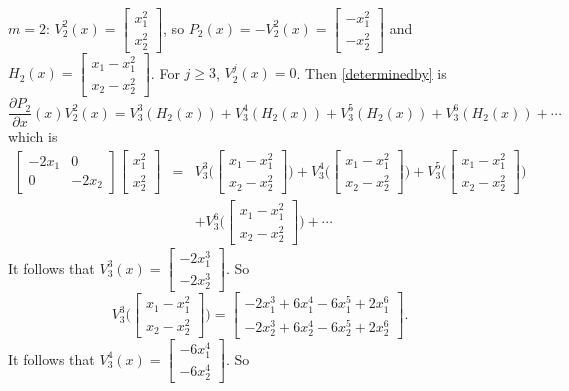 \documentclass{article}
\begin{document}
$m=2$:
$V_2^2(x)=\begin{bmatrix}x_1^2\\x_2^2\end{bmatrix}$, so $P_2(x)=-V_2^2(x)=\begin{bmatrix}
-x_1^2\\-x_2^2\end{bmatrix}$ and $H_2(x)=\begin{bmatrix}x_1-x_1^2\\x_2-x_2^2\end{bmatrix}$.
For $j \geq 3$, $V_2^j(x)=0$. Then \eqref{determinedby} is
\[
\frac{\partial P_2}{\partial x}(x)V_2^2(x)=V_3^3(H_2(x))+V_3^4(H_2(x))+V_3^5(H_2(x))+
V_3^6(H_2(x))+\cdots
\]
which is
\begin{eqnarray*}
\begin{bmatrix}-2x_1&0\\0&-2x_2\end{bmatrix}\begin{bmatrix}x_1^2\\x_2^2\end{bmatrix}
&=&V_3^3\Big( \begin{bmatrix}x_1-x_1^2\\x_2-x_2^2\end{bmatrix}\Big)
+V_3^4\Big( \begin{bmatrix}x_1-x_1^2\\x_2-x_2^2\end{bmatrix}\Big)
+V_3^5\Big( \begin{bmatrix}x_1-x_1^2\\x_2-x_2^2\end{bmatrix}\Big)\\
&&
+V_3^6\Big( \begin{bmatrix}x_1-x_1^2\\x_2-x_2^2\end{bmatrix}\Big)
+\cdots
\end{eqnarray*}
It follows that $V_3^3(x)=\begin{bmatrix}-2x_1^3\\-2x_2^3\end{bmatrix}$. So
\[
V_3^3\Big( \begin{bmatrix}x_1-x_1^2\\x_2-x_2^2\end{bmatrix}\Big)
=\begin{bmatrix}-2x_1^3+6x_1^4-6x_1^5+2x_1^6\\-2x_2^3+6x_2^4-6x_2^5+2x_2^6\end{bmatrix}.
\]
It follows that $V_3^4(x)=\begin{bmatrix}-6x_1^4\\-6x_2^4\end{bmatrix}$. So
\end{document}

